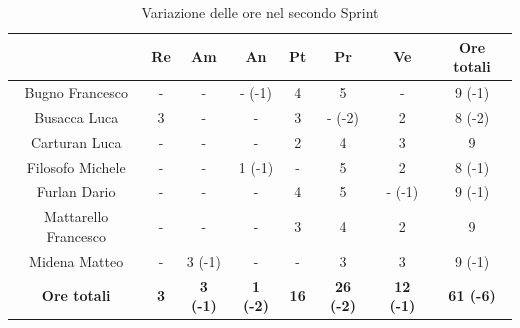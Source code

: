 \begin{table}[H]
  \centering
  \renewcommand{\arraystretch}{1.8}
  \begin{tabular}{c|c|c|c|c|c|c|c}
    \rowcolor[HTML]{125E28}
    \multicolumn{1}{c}{\color[HTML]{FFFFFF}\textbf{ Nominativo }}
                         & \multicolumn{1}{c}{\color[HTML]{FFFFFF}\textbf{ Re }}
                         & \multicolumn{1}{c}{\color[HTML]{FFFFFF}\textbf{ Am}}
                         & \multicolumn{1}{c}{\color[HTML]{FFFFFF}\textbf{ An }}
                         & \multicolumn{1}{c}{\color[HTML]{FFFFFF}\textbf{ Pt }}
                         & \multicolumn{1}{c}{\color[HTML]{FFFFFF}\textbf{ Pr }}
                         & \multicolumn{1}{c}{\color[HTML]{FFFFFF}\textbf{ Ve }}
                         & \multicolumn{1}{c}{\color[HTML]{FFFFFF}\textbf{ Ore totali }}                                                                                                            \\
    \hline
    Bugno Francesco      & -                                                             & -               & - (-1)          & 4           & 5                & -                & 9 (-1)           \\
    Busacca Luca         & 3                                                             & -               & -               & 3           & - (-2)           & 2                & 8 (-2)           \\
    Carturan Luca        & -                                                             & -               & -               & 2           & 4                & 3                & 9                \\
    Filosofo Michele     & -                                                             & -               & 1 (-1)          & -           & 5                & 2                & 8 (-1)           \\
    Furlan Dario         & -                                                             & -               & -               & 4           & 5                & - (-1)           & 9 (-1)           \\
    Mattarello Francesco & -                                                             & -               & -               & 3           & 4                & 2                & 9                \\
    Midena Matteo        & -                                                             & 3 (-1)          & -               & -           & 3                & 3                & 9 (-1)           \\
    \textbf{Ore totali}  & \textbf{3}                                                    & \textbf{3 (-1)} & \textbf{1 (-2)} & \textbf{16} & \textbf{26 (-2)} & \textbf{12 (-1)} & \textbf{61 (-6)}
  \end{tabular}
  \caption{Variazione delle ore nel secondo Sprint}
\end{table}

